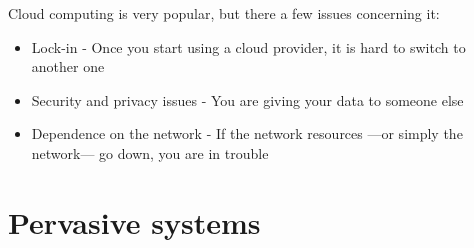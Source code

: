 {Cloud computing is very popular, but there a few issues concerning it:\ns
\begin{itemize}
   \item Lock-in - Once you start using a cloud provider, it is hard to switch to another one
   \item Security and privacy issues - You are giving your data to someone else
   \item Dependence on the network - If the network resources ---or simply the network--- go down, you are in trouble
\end{itemize}}

\section{Pervasive systems}

